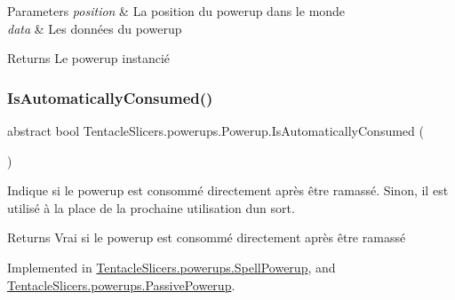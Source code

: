 \begin{DoxyParams}{Parameters}
{\em position} & La position du powerup dans le monde \\
\hline
{\em data} & Les données du powerup \\
\hline
\end{DoxyParams}
\begin{DoxyReturn}{Returns}
Le powerup instancié 
\end{DoxyReturn}
\mbox{\label{class_tentacle_slicers_1_1powerups_1_1_powerup_a52c58d3898d05020220fc317b6f901d9}} 
\subsubsection{\texorpdfstring{Is\+Automatically\+Consumed()}{IsAutomaticallyConsumed()}}
{\footnotesize\ttfamily abstract bool Tentacle\+Slicers.\+powerups.\+Powerup.\+Is\+Automatically\+Consumed (\begin{DoxyParamCaption}{ }\end{DoxyParamCaption})\hspace{0.3cm}{\ttfamily [pure virtual]}}



Indique si le powerup est consommé directement après être ramassé. Sinon, il est utilisé à la place de la prochaine utilisation d\textquotesingle{}un sort. 

\begin{DoxyReturn}{Returns}
Vrai si le powerup est consommé directement après être ramassé 
\end{DoxyReturn}


Implemented in \hyperlink{class_tentacle_slicers_1_1powerups_1_1_spell_powerup_ac1193ef31fbde4059684e65cde3db500}{Tentacle\+Slicers.\+powerups.\+Spell\+Powerup}, and \hyperlink{class_tentacle_slicers_1_1powerups_1_1_passive_powerup_ae6f8556eac0226913c40d83358b385d0}{Tentacle\+Slicers.\+powerups.\+Passive\+Powerup}.

\mbox{\label{class_tentacle_slicers_1_1powerups_1_1_powerup_ac386acbc8a371cd434c611fb591a9d6b}} 
